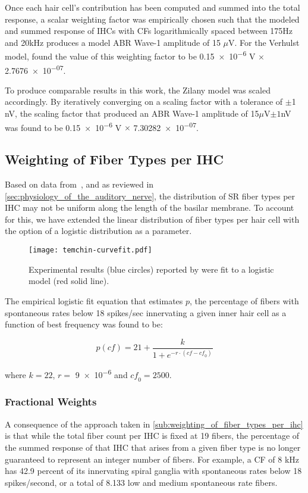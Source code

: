 Once each hair cell's contribution has been computed and summed into the total response,  a scalar weighting factor was empirically chosen such that the modeled and summed response of IHCs with CFs logarithmically spaced between 175Hz and 20kHz produces a model ABR Wave-1 amplitude of 15 $\mu$V.  For the Verhulst model, \citeauthor{Verhulst2015Functional} found the value of this weighting factor to be \num{0.15e-6} V $\times$ \num{2.7676e-07}.

To produce comparable results in this work, the Zilany model was scaled accordingly. By iteratively converging on a scaling factor with a tolerance of $\pm$1 nV, the scaling factor that produced an ABR Wave-1 amplitude of 15$\mu$V$\pm 1$nV was found to be \num{0.15e-6} V $\times$ \num{7.30282e-07}.

\subsection{Weighting of Fiber Types per IHC} %
\label{sub:weighting_of_fiber_types_per_ihc}
Based on data from~\cite{Temchin2008Threshold}, and as reviewed in \autoref{sec:physiology_of_the_auditory_nerve}, the distribution of SR fiber types per IHC may not be uniform along the length of the basilar membrane.  To account for this, we have extended the linear distribution of fiber types per hair cell with the option of a logistic distribution as a parameter. 

\begin{figure}[htbp]
	\centering
	\texttt{[image: temchin-curvefit.pdf]}
	\caption[Variation in Spontaneous Rate as a Function of Frequency]{Experimental results (blue circles) reported by \citeauthor{Temchin2008Threshold} were fit to a logistic model (red solid line).}
	\label{fig:temchin-curvefit}
\end{figure}

The empirical logistic fit equation that estimates $p$, the percentage of fibers with spontaneous rates below 18 spikes/sec innervating a given inner hair cell as a function of best frequency was found to be: 

\begin{equation}
	p(\mathit{cf}) = 21 + \frac{k}{1+e^{-r\cdot(\mathit{cf}-\mathit{cf}_0)}}
\end{equation}

where $k = 22$, $r = $ \num{9e-6} and $\mathit{cf}_0 = 2500$.

\subsubsection{Fractional Weights}
A consequence of the approach taken in \autoref{sub:weighting_of_fiber_types_per_ihc} is that while the total fiber count per IHC is fixed at 19 fibers, the percentage of the summed response of that IHC that arises from a given fiber type is no longer guaranteed to represent an integer number of fibers.  For example, a CF of 8 kHz has 42.9 percent of its innervating spiral ganglia with spontaneous rates below 18 spikes/second, or a total of 8.133 low and medium spontaneous rate fibers.  

